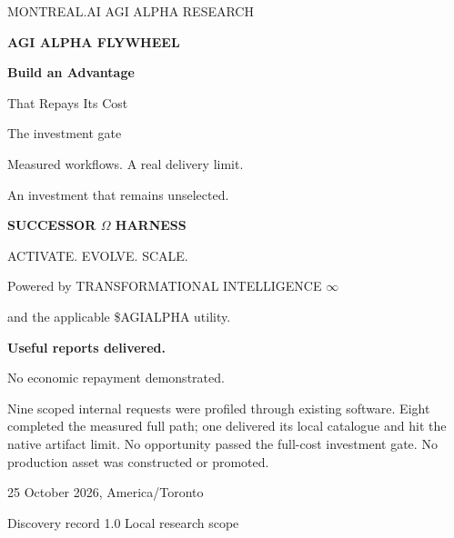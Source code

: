 \documentclass[11pt,letterpaper]{article}
\begin{document}
\begin{titlepage}
\color{white}
{\sffamily\small MONTREAL.AI \hfill AGI ALPHA RESEARCH\par}
\vspace{.9in}
{\sffamily\bfseries\fontsize{14}{18}\selectfont AGI ALPHA FLYWHEEL\par}
\vspace{.22in}
{\sffamily\bfseries\fontsize{33}{38}\selectfont Build an Advantage\par That Repays Its Cost\par}
\vspace{.3in}
{\sffamily\fontsize{17}{23}\selectfont The investment gate\par}
\vspace{.13in}
{\fontsize{13}{18}\selectfont Measured workflows. A real delivery limit.\par An investment that remains unselected.\par}
\vspace{.55in}
{\sffamily\bfseries SUCCESSOR $\Omega$ HARNESS\par ACTIVATE. EVOLVE. SCALE.\par}
\vspace{.12in}
{\small Powered by TRANSFORMATIONAL INTELLIGENCE $\infty$\par and the applicable \$AGIALPHA utility.\par}
\vfill
{\sffamily\bfseries\fontsize{17}{22}\selectfont Useful reports delivered.\par No economic repayment demonstrated.\par}
\vspace{.15in}
\begin{minipage}{.9\linewidth}
\small Nine scoped internal requests were profiled through existing software. Eight completed the measured full path; one delivered its local catalogue and hit the native artifact limit. No opportunity passed the full-cost investment gate. No production asset was constructed or promoted.
\end{minipage}\par
\vspace{.28in}
{\small 25 October 2026, America/Toronto\par Discovery record 1.0 \;\textbullet\; Local research scope\par}
\end{titlepage}
\setcounter{page}{1}
\end{document}
